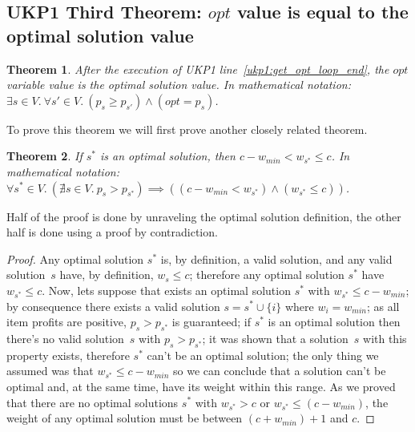 \documentclass[12pt]{article}
\newtheorem{theorem}{Theorem}
\begin{document}

\subsection{UKP1 Third Theorem: \(opt\) value is equal to the optimal solution value}

\begin{theorem}\label{theo:ukp1:opt_variable}
After the execution of UKP1 line~\ref{ukp1:get_opt_loop_end}, the \(opt\) variable value is the optimal solution value. In mathematical notation: \(\exists s \in V.~\forall s' \in V.~(p_s \geq p_{s'}) \land (opt = p_s)\).
\end{theorem}

To prove this theorem we will first prove another closely related theorem.

\begin{theorem}\label{theo:opt_sol_weight_range}
If \(s^*\) is an optimal solution, then \(c - w_{min} < w_{s^*} \leq c\). In mathematical notation: \(\forall s^* \in V.~(\nexists s \in V.~p_s > p_{s^*}) \implies ((c - w_{min} < w_{s^*}) \land (w_{s^*} \leq c))\).
\end{theorem}

Half of the proof is done by unraveling the optimal solution definition, the other half is done using a proof by contradiction.

\begin{proof}
Any optimal solution \(s^*\) is, by definition, a valid solution, and any valid solution~\(s\) have, by definition, \(w_s \leq c\); therefore any optimal solution \(s^*\) have \(w_{s^*} \leq c\). Now, lets suppose that exists an optimal solution \(s^*\) with \({w_{s^*} \leq c - w_{min}}\); by consequence there exists a valid solution \(s = s^* \cup \{i\}\) where \(w_i = w_{min}\); as all item profits are positive, \(p_s > p_{s^*}\) is guaranteed; if \(s^*\) is an optimal solution then there's no valid solution~\(s\) with \(p_s > p_{s^*}\); it was shown that a solution~\(s\) with this property exists, therefore \(s^*\) can't be an optimal solution; the only thing we assumed was that \(w_{s^*} \leq c - w_{min}\) so we can conclude that a solution can't be optimal and, at the same time, have its weight within this range. As we proved that there are no optimal solutions \(s^*\) with \(w_{s^*} > c\) or \(w_{s^*} \leq (c - w_{min})\), the weight of any optimal solution must be between \((c + w_{min}) + 1\) and \(c\).
\end{proof}
\end{document}
